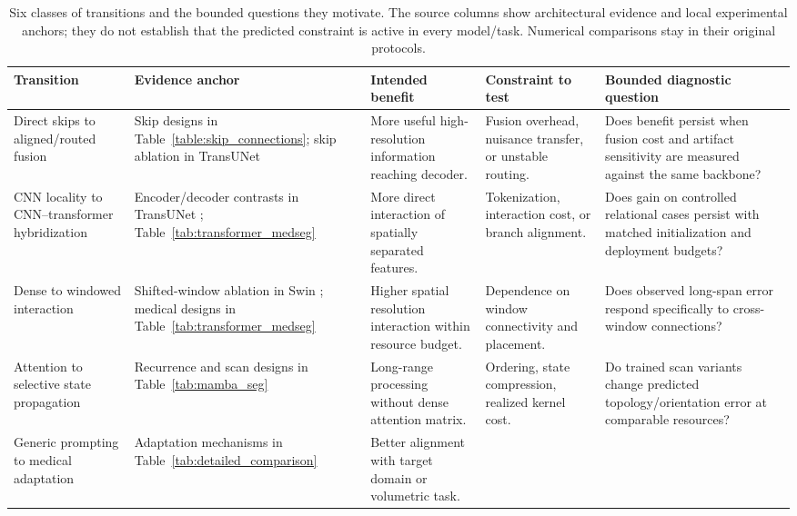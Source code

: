 \documentclass[5p,times,authoryear]{elsarticle}
\begin{document}
\begin{table}[t]
\centering
\caption{Six classes of transitions and the bounded questions they motivate. The source columns show architectural evidence and local experimental anchors; they do not establish that the predicted constraint is active in every model/task. Numerical comparisons stay in their original protocols.}
\label{tab:redistribution_evidence}
\scriptsize
\renewcommand{\arraystretch}{1.12}
\setlength{\tabcolsep}{3pt}
\begin{tabular}{>{\raggedright\arraybackslash}p{2.7cm}>{\raggedright\arraybackslash}p{3.05cm}>{\raggedright\arraybackslash}p{3.15cm}>{\raggedright\arraybackslash}p{3.45cm}>{\raggedright\arraybackslash}p{3.8cm}}
\toprule
\textbf{Transition} & \textbf{Evidence anchor} & \textbf{Intended benefit} & \textbf{Constraint to test} & \textbf{Bounded diagnostic question} \\
\midrule
Direct skips to aligned/routed fusion
& Skip designs in Table~\ref{table:skip_connections}; skip ablation in TransUNet \citep{chen2021transunet}
& More useful high-resolution information reaching decoder.
& Fusion overhead, nuisance transfer, or unstable routing.
& Does benefit persist when fusion cost and artifact sensitivity are measured against the same backbone? \\
CNN locality to CNN--transformer hybridization
& Encoder/decoder contrasts in TransUNet \citep{chen2021transunet}; Table~\ref{tab:transformer_medseg}
& More direct interaction of spatially separated features.
& Tokenization, interaction cost, or branch alignment.
& Does gain on controlled relational cases persist with matched initialization and deployment budgets? \\
Dense to windowed interaction
& Shifted-window ablation in Swin \citep{review95_liu2021swin}; medical designs in Table~\ref{tab:transformer_medseg}
& Higher spatial resolution interaction within resource budget.
& Dependence on window connectivity and placement.
& Does observed long-span error respond specifically to cross-window connections? \\
Attention to selective state propagation
& Recurrence and scan designs in Table~\ref{tab:mamba_seg}
& Long-range processing without dense attention matrix.
& Ordering, state compression, realized kernel cost.
& Do trained scan variants change predicted topology/orientation error at comparable resources? \\
Generic prompting to medical adaptation
& Adaptation mechanisms in Table~\ref{tab:detailed_comparison}
& Better alignment with target domain or volumetric task.

\end{tabular}
\end{table}
\end{document}
